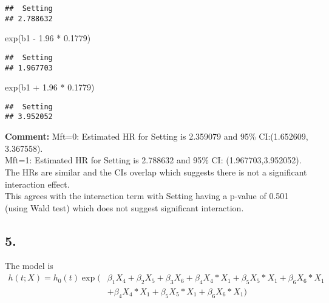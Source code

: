 \documentclass[
]{article}
\newenvironment{Shaded}{\begin{snugshade}}{\end{snugshade}}
\newcommand{\FloatTok}[1]{\textcolor[rgb]{0.00,0.00,0.81}{#1}}
\newcommand{\FunctionTok}[1]{\textcolor[rgb]{0.00,0.00,0.00}{#1}}
\newcommand{\NormalTok}[1]{#1}
\newcommand{\SpecialCharTok}[1]{\textcolor[rgb]{0.00,0.00,0.00}{#1}}
\begin{document}
\begin{verbatim}
##  Setting 
## 2.788632
\end{verbatim}

\begin{Shaded}
\begin{Highlighting}[]
\FunctionTok{exp}\NormalTok{(b1 }\SpecialCharTok{{-}} \FloatTok{1.96} \SpecialCharTok{*} \FloatTok{0.1779}\NormalTok{)}
\end{Highlighting}
\end{Shaded}

\begin{verbatim}
##  Setting 
## 1.967703
\end{verbatim}

\begin{Shaded}
\begin{Highlighting}[]
\FunctionTok{exp}\NormalTok{(b1 }\SpecialCharTok{+} \FloatTok{1.96} \SpecialCharTok{*} \FloatTok{0.1779}\NormalTok{)}
\end{Highlighting}
\end{Shaded}

\begin{verbatim}
##  Setting 
## 3.952052
\end{verbatim}

\textbf{Comment:} Mft=0: Estimated HR for Setting is 2.359079 and 95\%
CI:(1.652609, 3.367558).\\
Mft=1: Estimated HR for Setting is 2.788632 and 95\% CI:
(1.967703,3.952052).\\
The HRs are similar and the CIs overlap which suggests there is not a
significant interaction effect.\\
This agrees with the interaction term with Setting having a p-value of
0.501 (using Wald test) which does not suggest significant interaction.

\hypertarget{section}{%
\subsection{5.}\label{section}}

The model is \begin{align*}
h(t;X)=h_0(t)\exp(&\beta_1 X_4 +  \beta_2 X_5 + \beta_3 X_6 + \beta_4 X_4*X_1 + \beta_5 X_5*X_1 + \beta_6 X_6*X_1 \\
                  &+\beta_4 X_4*X_1 + \beta_5 X_5*X_1 + \beta_6 X_6*X_1)
\end{align*}
\end{document}
